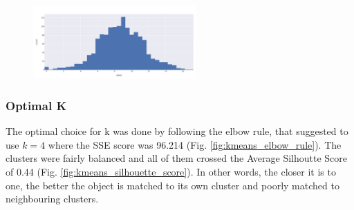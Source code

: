 \documentclass{article}
\begin{document}
\begin{figure}[h]
\begin{minipage}{.5\textwidth}
\label{fig:matches_per_day}
\end{minipage}%
\begin{minipage}{.5\textwidth}
\centering
\includegraphics[width=235px]{log_variance_rank_points}
\label{fig:log_variance_rank_points}
\end{minipage}
\end{figure}

\subsubsection{Optimal K}
The optimal choice for k was done by following the elbow rule, that suggested to use $k=4$ where the SSE score was 96.214 (Fig. \ref{fig:kmeans_elbow_rule}). The clusters were fairly balanced and all of them crossed the Average Silhoutte Score of 0.44 (Fig. \ref{fig:kmeans_silhouette_score}). In other words, the closer it is to one, the better the object is matched to its own cluster and poorly matched to neighbouring clusters.
\end{document}
